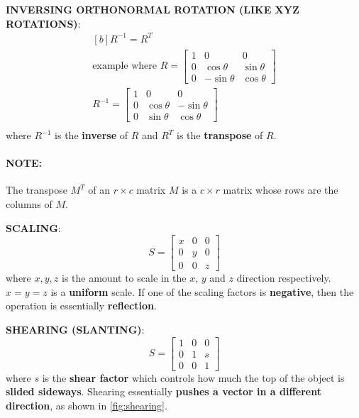 \documentclass{article}
\begin{document}
\textbf{INVERSING ORTHONORMAL ROTATION (LIKE XYZ ROTATIONS)}:
\begin{equation}
	\begin{aligned}[b]
	R^{-1} = R^T \\
	\text{example where }R = \left[ \begin{matrix}
	1 & 0 & 0 \\
	0 & \cos \theta & \sin \theta \\
	0 & -\sin \theta & \cos \theta
	\end{matrix} \right] \\
	R^{-1} = \left[ \begin{matrix}
	1 & 0 & 0 \\
	0 & \cos \theta & -\sin \theta \\
	0 & \sin \theta & \cos \theta
	\end{matrix} \right] \\
	\end{aligned}
	\label{eq:inverse-orthonormal-rotations}
\end{equation}
where $R^{-1}$ is the \textbf{inverse} of $R$ and $R^T$ is the \textbf{transpose} of $R$.

\paragraph{\textbf{NOTE}: } The transpose $M^T$ of an $r \times c$ matrix $M$ is a $c \times r$ matrix whose rows are the columns of $M$.

\textbf{SCALING}:
\begin{equation}
	S = 
	\left[ \begin{matrix}
	x & 0 & 0 \\
	0 & y & 0 \\
	0 & 0 & z
	\end{matrix} \right]
	\label{eq:scaling}
\end{equation}
where $x,y,z$ is the amount to scale in the $x$, $y$ and $z$ direction respectively. $x = y = z$ is a \textbf{uniform} scale. If one of the scaling factors is \textbf{negative}, then the operation is essentially \textbf{reflection}.

\textbf{SHEARING (SLANTING)}:
\begin{equation}
	S = 
	\left[ \begin{matrix}
	1 & 0 & 0 \\
	0 & 1 & s \\
	0 & 0 & 1
	\end{matrix} \right]
	\label{eq:shearing}
\end{equation}
where $s$ is the \textbf{shear factor} which controls how much the top of the object is \textbf{slided sideways}. Shearing essentially \textbf{pushes a vector in a different direction}, as shown in \ref{fig:shearing}.
\end{document}

